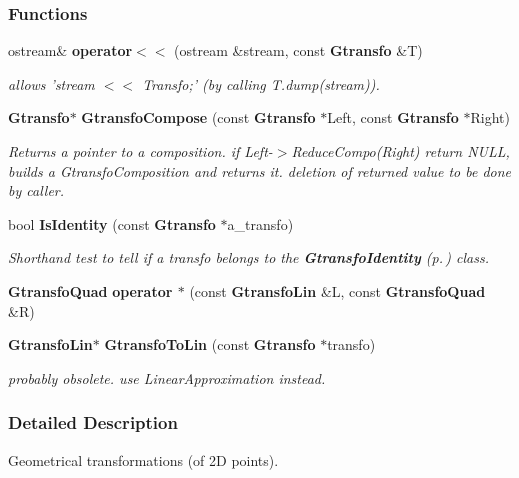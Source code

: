 \subsubsection*{Functions}
\begin{CompactItemize}
\item 
{}
ostream\& {\bf operator$<$$<$} (ostream \&stream, const {\bf Gtransfo} \&T)\label{gtransfo_h_a0}

\begin{CompactList}\small\item\em allows 'stream $<$$<$ Transfo;' (by calling T.dump(stream)).\item\end{CompactList}\item 
{}
{\bf Gtransfo}$\ast$ {\bf Gtransfo\-Compose} (const {\bf Gtransfo} $\ast$Left, const {\bf Gtransfo} $\ast$Right)\label{gtransfo_h_a1}

\begin{CompactList}\small\item\em Returns a pointer to a composition. if Left-$>$Reduce\-Compo(Right) return NULL, builds a Gtransfo\-Composition and returns it. deletion of returned value to be done by caller.\item\end{CompactList}\item 
{}
bool {\bf Is\-Identity} (const {\bf Gtransfo} $\ast$a\_\-transfo)\label{gtransfo_h_a2}

\begin{CompactList}\small\item\em Shorthand test to tell if a transfo belongs to the {\bf Gtransfo\-Identity} {\rm (p.\,\pageref{class_gtransfoidentity})} class.\item\end{CompactList}\item 
{}
{\bf Gtransfo\-Quad} {\bf operator $\ast$} (const {\bf Gtransfo\-Lin} \&L, const {\bf Gtransfo\-Quad} \&R)\label{gtransfo_h_a3}

\item 
{}
{\bf Gtransfo\-Lin}$\ast$ {\bf Gtransfo\-To\-Lin} (const {\bf Gtransfo} $\ast$transfo)\label{gtransfo_h_a4}

\begin{CompactList}\small\item\em probably obsolete. use Linear\-Approximation instead.\item\end{CompactList}\end{CompactItemize}


\subsubsection{Detailed Description}
Geometrical transformations (of 2D points).



